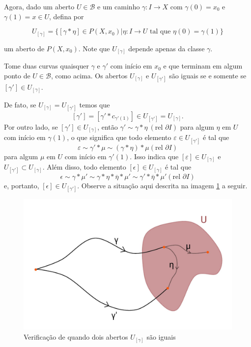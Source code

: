 \begin{dem}
     Agora, dado um aberto $U\in \mathcal{B}$ e um caminho $\gamma:I\rightarrow X$ com $\gamma(0)=x_0$ e $\gamma(1)=x\in U$, defina por

     $$U_{[\gamma]}=\{[\gamma* \eta]\in P(X,x_0)| \eta:I\rightarrow U\text{ tal que } \eta(0)=\gamma(1)\}$$


     um aberto de $P(X,x_0)$. Note que $U_{[\gamma]}$ depende apenas da classe $\gamma$.

     Tome duas curvas quaisquer $\gamma$ e $\gamma'$ com início em $x_0$ e que terminam em algum ponto de $U\in \mathcal{B}$, como acima. Os abertos $U_{[\gamma]}$ e $U_{[\gamma']}$ são iguais se e somente se $[\gamma']\in U_{[\gamma]}$.
     
     De fato, se $U_{[\gamma]}=U_{[\gamma']}$ temos que $$[\gamma']=[\gamma'*c_{\gamma'(1)}]\in U_{[\gamma']}=U_{[\gamma]}.$$ Por outro lado, se $[\gamma']\in U_{[\gamma]}$, então $\gamma'\sim \gamma *\eta ~(\text{rel }\partial I)$ para algum $\eta$ em $U$ com início em $\gamma(1)$, o que significa que todo elemento $\varepsilon\in U_{[\gamma']}$ é tal que $$\varepsilon\sim\gamma'*\mu\sim (\gamma*\eta)*\mu (\text{rel }\partial I)$$ para algum $\mu$ em $U$ com início em $\gamma'(1)$. Isso indica que $[\varepsilon]\in U_{[\gamma]}$ e $U_{[\gamma']}\subset U_{[\gamma]}$. Além disso, todo elemento $[\epsilon] \in U_{[\gamma]}$ é tal que $$\epsilon \sim \gamma * \mu' \sim \gamma*\eta*\overline{\eta}*\mu'\sim \gamma' *\overline{\eta}*\mu'(\text{rel }\partial I)$$ e, portanto, $[\epsilon]\in U_{[\gamma']}$. Observe a situação aqui descrita na imagem \ref{fig:cobertura-P(X,x_0)} a seguir.

     \begin{figure}[h!]
         \centering
         \includegraphics[width=0.8\linewidth]{conteudo/fig-cobertura-P(X,x_0).jpeg}
         \caption{Verificação de quando dois abertos $U_{[\gamma]}$ são iguais}
         \label{fig:cobertura-P(X,x_0)}
     \end{figure} 


\end{dem}
